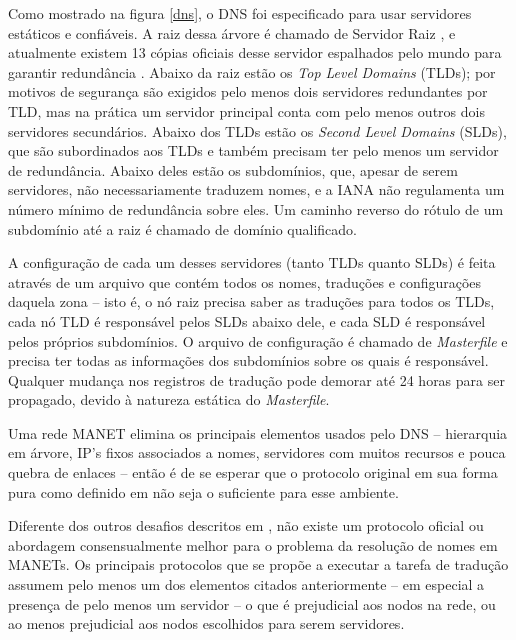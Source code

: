Como mostrado na figura \ref{dns}, o DNS foi especificado para usar servidores
estáticos e confiáveis. A raiz dessa árvore é chamado de Servidor Raiz
\cite{rfc1035}, e atualmente existem 13 cópias oficiais desse servidor espalhados
pelo mundo para garantir redundância \cite{iana}. Abaixo da raiz estão os
\textit{Top Level Domains} (TLDs); por motivos de segurança são exigidos pelo
menos dois servidores redundantes por TLD, mas na prática um servidor principal
conta com pelo menos outros dois servidores secundários. Abaixo dos TLDs estão
os \textit{Second Level Domains} (SLDs), que são subordinados aos TLDs e também
precisam ter pelo menos um servidor de redundância. Abaixo deles estão os subdomínios,
que, apesar de serem servidores, não necessariamente traduzem nomes, e a IANA não
regulamenta um número mínimo de redundância sobre eles. Um caminho reverso do
rótulo de um subdomínio até a raiz é chamado de domínio qualificado.

A configuração de cada um desses servidores (tanto TLDs quanto SLDs) é feita através de
um arquivo que contém todos os nomes, traduções e configurações daquela zona -- 
isto é, o nó raiz precisa saber as traduções para todos os TLDs, cada nó
TLD é responsável pelos SLDs abaixo dele, e cada SLD é responsável pelos próprios
subdomínios. O arquivo de configuração é chamado de \textit{Masterfile} e precisa
ter todas as informações dos subdomínios sobre os quais é responsável. Qualquer
mudança nos registros de tradução pode demorar até 24 horas para ser propagado,
devido à natureza estática do \textit{Masterfile}.

Uma rede MANET elimina os principais elementos usados pelo DNS -- hierarquia em
árvore, IP's fixos associados a nomes, servidores com muitos recursos e pouca
quebra de enlaces -- então é de se esperar que o protocolo original em sua forma
pura como definido em \cite{rfc1035} não seja o suficiente para esse ambiente.

Diferente dos outros desafios descritos em \cite{manet-state}, não existe um
protocolo oficial ou abordagem consensualmente melhor para o problema da
resolução de nomes em MANETs. Os principais protocolos que se propõe a executar
a tarefa de tradução assumem pelo menos um dos elementos citados anteriormente -- em
especial a presença de pelo menos um servidor -- o que é prejudicial aos nodos
na rede, ou ao menos prejudicial aos nodos escolhidos para serem servidores.

